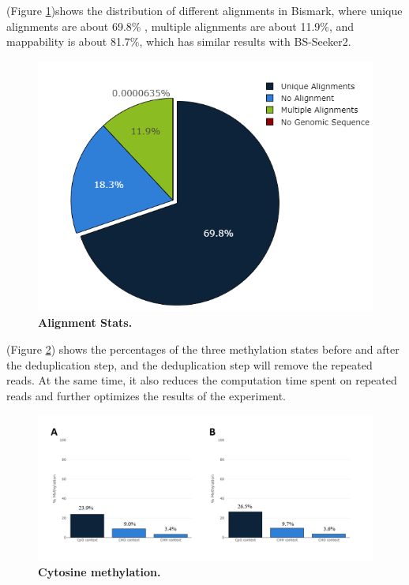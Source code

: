 \documentclass{PHlab-thesis}
\begin{document}
(Figure \ref{f8})shows the distribution of different alignments in Bismark, where unique alignments are about 69.8\% , multiple alignments are about 11.9\%, and mappability is about 81.7\%, which has similar results with BS-Seeker2.

\begin{figure}[h]
  \centering
  \includegraphics[scale=0.4]{figures/align_fig.png}
  \caption{\textbf{Alignment Stats.}
  }
  \label{f8}
\end{figure}

(Figure \ref{f9}) shows the percentages of the three methylation states before and after the deduplication step, and the deduplication step will remove the repeated reads. At the same time, it also reduces the computation time spent on repeated reads and further optimizes the results of the experiment.

\begin{figure}[h]
  \centering
  \includegraphics[scale=0.8]{figures/cytosine_methylation.png}
  \caption{\textbf{Cytosine methylation.}
  }
  \label{f9}
\end{figure}
\end{document}
